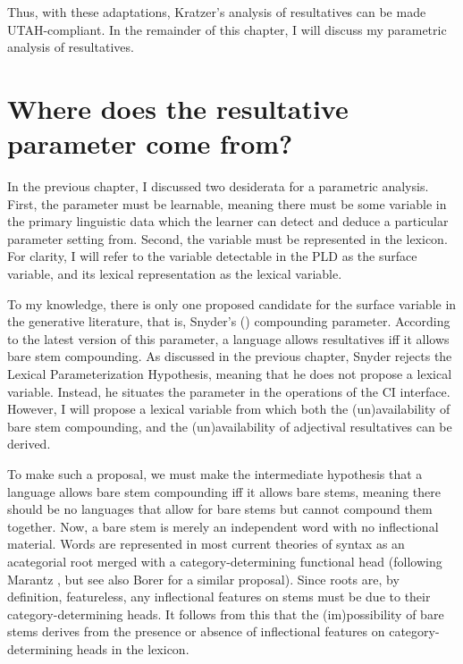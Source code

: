 \documentclass[MilwayThesis]{subfiles}
\begin{document}
Thus, with these adaptations, Kratzer's analysis of resultatives can be made UTAH-compliant.
In the remainder of this chapter, I will discuss my parametric analysis of resultatives.

\section{Where does the resultative parameter come from?}
In the previous chapter, I discussed two desiderata for a parametric analysis.
First, the parameter must be learnable, meaning there must be some variable in the primary linguistic data which the learner can detect and deduce a particular parameter setting from.
Second, the variable must be represented in the lexicon.
For clarity, I will refer to the variable detectable in the PLD as the surface variable, and its lexical representation as the lexical variable.

To my knowledge, there is only one proposed candidate for the surface variable in the generative literature, that is, Snyder's (\citeyear{snyder1995language,snyder2012parameter}) compounding parameter.
According to the latest version of this parameter, a language allows resultatives iff it allows bare stem compounding.
As discussed in the previous chapter, Snyder rejects the Lexical Parameterization Hypothesis, meaning that he does not propose a lexical variable.
Instead, he situates the parameter in the operations of the CI interface.
However, I will propose a lexical variable from which both the (un)availability of bare stem compounding, and the (un)availability of adjectival resultatives can be derived.

To make such a proposal, we must make the intermediate hypothesis that a language allows bare stem compounding iff it allows bare stems, meaning there should be no languages that allow for bare stems but cannot compound them together.
Now, a bare stem is merely an independent word with no inflectional material.
Words are represented in most current theories of syntax as an acategorial root merged with a category-determining functional head (following Marantz \citeyear{marantz1997no}, but see also Borer \citeyear{borer2005name} for a similar proposal).
Since roots are, by definition, featureless, any inflectional features on stems must be due to their category-determining heads.
It follows from this that the (im)possibility of bare stems derives from the presence or absence of inflectional features on category-determining heads in the lexicon.
\end{document}
